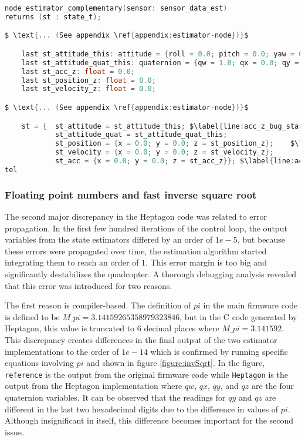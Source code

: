 \documentclass[10pt, a4paper]{article}
\newcommand{\code}[1]{\texttt{#1}}
\begin{document}
    \begin{lstlisting}[caption={Buggy Heptagon node}, label={listing:Heptagon_bug}, language=C]
node estimator_complementary(sensor: sensor_data_est)
returns (st : state_t);

$ \text{... (See appendix \ref{appendix:estimator-node})}$

    last st_attitude_this: attitude = {roll = 0.0; pitch = 0.0; yaw = 0.0};
    last st_attitude_quat_this: quaternion = {qw = 1.0; qx = 0.0; qy = 0.0; qz = 0.0};
    last st_acc_z: float = 0.0;
    last st_position_z: float = 0.0;
    last st_velocity_z: float = 0.0;

$ \text{... (See appendix \ref{appendix:estimator-node})}$

    st = {  st_attitude = st_attitude_this; $\label{line:acc_z_bug_start}$
            st_attitude_quat = st_attitude_quat_this;
            st_position = {x = 0.0; y = 0.0; z = st_position_z};    $\label{line:st-position}$
            st_velocity = {x = 0.0; y = 0.0; z = st_velocity_z};
            st_acc = {x = 0.0; y = 0.0; z = st_acc_z}}; $\label{line:acc_z_bug_end}$
tel
\end{lstlisting}
    \bigskip

    \subsubsection{Floating point numbers and fast inverse square root}
    The second major discrepancy in the Heptagon code was related to error propagation. In the first few hundred iterations of the control loop, the output variables from the state estimators differed by an order of $1e-5$, but because these errors were propagated over time, the estimation algorithm started integrating them to reach an order of $1$. This error margin is too big and significantly destabilizes the quadcopter. A thorough debugging analysis revealed that this error was introduced for two reasons. 

    The first reason is compiler-based. The definition of $pi$ in the main firmware code is defined to be $M\_pi = 3.14159265358979323846$, but in the C code generated by Heptagon, this value is truncated to $6$ decimal places where $M\_pi = 3.141592$. This discrepancy creates differences in the final output of the two estimator implementations to the order of $1e-14$ which is confirmed by running specific equations involving $pi$ and shown in figure \ref{figure:invSqrt}. In the figure,  \code{reference} is the output from the original firmware code while \code{Heptagon} is the output from the Heptagon implementation where $qw$, $qx$, $qy$, and $qz$ are the four quaternion variables. It can be observed that the readings for $qy$ and $qz$ are different in the last two hexadecimal digits due to the difference in values of $pi$. Although insignificant in itself, this difference becomes important for the second issue.
\end{document}

